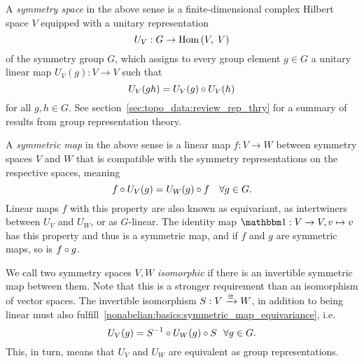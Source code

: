\clearpage
\begin{doublecol}
    A \emph{symmetry space} in the above sense is a finite-dimensional complex Hilbert space $V$ equipped with a unitary representation
    $$
        U_V: G \to \mathrm{Hom}\left(V,\; V\right)
    $$
    of the symmetry group $G$, which assigns to every group element $g \in G$ a unitary linear map $U_V(g) : V \to V$ such that $$U_V(g h) = U_V(g) \circ U_V(h)$$ for all $g, h \in G$.
    See section~\ref{sec:topo_data:review_rep_thry} for a summary of results from group representation theory.

    A \emph{symmetric map} in the above sense is a linear map $f: V \to W$ between symmetry spaces $V$ and $W$ that is compatible with the symmetry representations on the respective spaces, meaning
    \begin{equation}
        \label{nonabelian:basics:symmetric_map_equivariance}
        f \circ U_V(g) = U_W(g) \circ f \quad\forall g \in G
        .
    \end{equation}
    Linear maps $f$ with this property are also known as equivariant, as intertwiners between $U_V$ and $U_W$, or as $G$-linear.
    The identity map $\eye: V \to V, v \mapsto v$ has this property and thus is a symmetric map, and if $f$ and $g$ are symmetric maps, so is $f \circ g$.

    We call two symmetry spaces $V, W$ \emph{isomorphic} if there is an invertible symmetric map between them.
    Note that this is a stronger requirement than an isomorphism of vector spaces.
    The invertible isomorphism $S: V \xrightarrow{\cong} W$, in addition to being linear must also fulfill~\eqref{nonabelian:basics:symmetric_map_equivariance}, i.e.~
    \begin{equation}
        \label{nonabelian:basics:groups_isomorphism_makes_reps_equivalent}
        U_V(g) = S^{-1} \circ U_W(g) \circ S ~~\forall g \in G.
    \end{equation}
    This, in turn, means that $U_V$ and $U_W$ are equivalent as group representations.


\end{doublecol}
